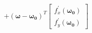 \documentclass[preview]{standalone}
\begin{document}
\begin{align*}
+ (\mathbf{\omega} - \mathbf{\omega_0})^T \begin{bmatrix} f_x^{\prime}(\mathbf{\omega_0}) \\ f_y^{\prime}(\mathbf{\omega_0}) \end{bmatrix}
\end{align*}
\end{document}
